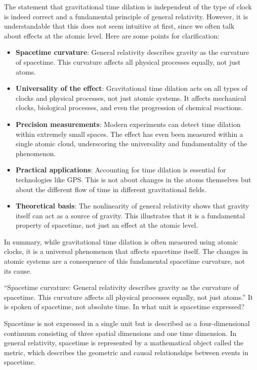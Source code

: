 \documentclass[a4paper,12pt]{article}
\begin{document}
	The statement that gravitational time dilation is independent of the type of clock is indeed correct and a fundamental principle of general relativity. However, it is understandable that this does not seem intuitive at first, since we often talk about effects at the atomic level. Here are some points for clarification:
	\begin{itemize}
		\item \textbf{Spacetime curvature}: General relativity describes gravity as the curvature of spacetime. This curvature affects all physical processes equally, not just atoms.
		\item \textbf{Universality of the effect}: Gravitational time dilation acts on all types of clocks and physical processes, not just atomic systems. It affects mechanical clocks, biological processes, and even the progression of chemical reactions.
		\item \textbf{Precision measurements}: Modern experiments can detect time dilation within extremely small spaces. The effect has even been measured within a single atomic cloud, underscoring the universality and fundamentality of the phenomenon.
		\item \textbf{Practical applications}: Accounting for time dilation is essential for technologies like GPS. This is not about changes in the atoms themselves but about the different flow of time in different gravitational fields.
		\item \textbf{Theoretical basis}: The nonlinearity of general relativity shows that gravity itself can act as a source of gravity. This illustrates that it is a fundamental property of spacetime, not just an effect at the atomic level.
	\end{itemize}
	In summary, while gravitational time dilation is often measured using atomic clocks, it is a universal phenomenon that affects spacetime itself. The changes in atomic systems are a consequence of this fundamental spacetime curvature, not its cause.
	
	``Spacetime curvature: General relativity describes gravity as the curvature of spacetime. This curvature affects all physical processes equally, not just atoms.'' It is spoken of spacetime, not absolute time. In what unit is spacetime expressed?
	
	Spacetime is not expressed in a single unit but is described as a four-dimensional continuum consisting of three spatial dimensions and one time dimension. In general relativity, spacetime is represented by a mathematical object called the metric, which describes the geometric and causal relationships between events in spacetime.
	
\end{document}
